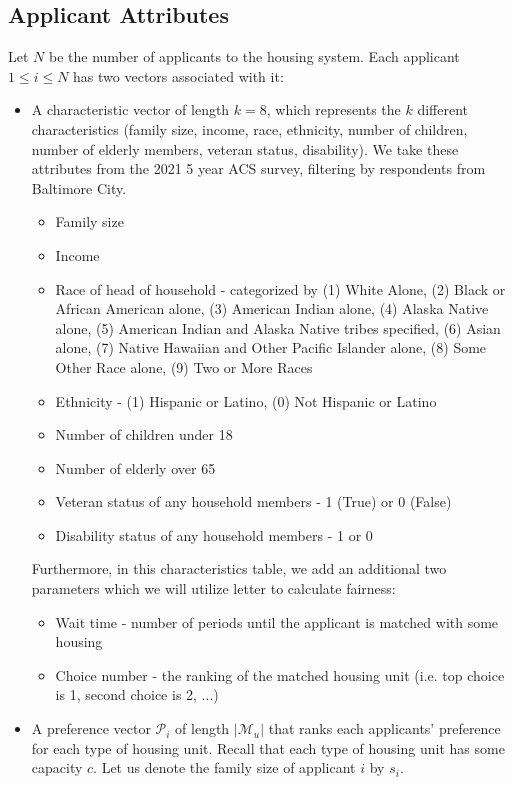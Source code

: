 \documentclass[11pt]{article}
\begin{document}
\subsection{Applicant Attributes}
\label{3.2}
Let $N$ be the number of applicants to the housing system. Each applicant $1 \leq i \leq N$ has two vectors associated with it: 
\begin{itemize}
    \item A characteristic vector of length $k = 8$, which represents the $k$ different characteristics (family size, income, race, ethnicity, number of children, number of elderly members, veteran status, disability). We take these attributes from the 2021 5 year ACS survey, filtering by respondents from Baltimore City.
    \begin{itemize}
        \item Family size 
        \item Income
        \item Race of head of household - categorized by (1) White Alone, (2) Black or African American alone, (3) American Indian alone, (4) Alaska Native alone, (5) American Indian and Alaska Native tribes specified, (6) Asian alone, (7) Native Hawaiian and Other Pacific Islander alone, (8) Some Other Race alone, (9) Two or More Races
        \item Ethnicity - (1) Hispanic or Latino, (0) Not Hispanic or Latino
        \item Number of children under 18
        \item Number of elderly over 65
        \item Veteran status of any household members - 1 (True) or 0 (False)
        \item Disability status of any household members - 1 or 0
    \end{itemize}
    Furthermore, in this characteristics table, we add an additional two parameters which we will utilize letter to calculate fairness:
    \begin{itemize}
        \item Wait time - number of periods until the applicant is matched with some housing
        \item Choice number - the ranking of the matched housing unit (i.e. top choice is 1, second choice is 2, ...)
    \end{itemize}
    \item A preference vector $\mathcal{P}_i$ of length $|\mathcal{M}_u|$ that ranks each applicants' preference for each type of housing unit. Recall that each type of housing unit has some capacity $c$. Let us denote the family size of applicant $i$ by $s_i$. \\

\end{itemize}
\end{document}
